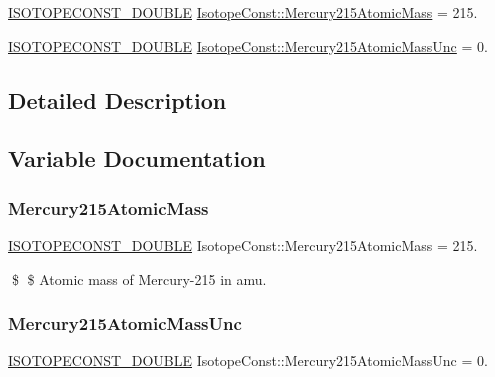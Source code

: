 \begin{DoxyCompactItemize}
\item 
\mbox{\hyperlink{group___isotope_const-_macros_ga8f45a7272ce02c0b4c65c44636ed719a}{I\+S\+O\+T\+O\+P\+E\+C\+O\+N\+S\+T\+\_\+\+D\+O\+U\+B\+LE}} \mbox{\hyperlink{group___isotope_const-_mercury-_hg215_ga5ef3a74131a8ca927cc3a9107f4a1810}{Isotope\+Const\+::\+Mercury215\+Atomic\+Mass}} = 215.
\item 
\mbox{\hyperlink{group___isotope_const-_macros_ga8f45a7272ce02c0b4c65c44636ed719a}{I\+S\+O\+T\+O\+P\+E\+C\+O\+N\+S\+T\+\_\+\+D\+O\+U\+B\+LE}} \mbox{\hyperlink{group___isotope_const-_mercury-_hg215_ga79e4d87707132ab8d67a0b5429750e73}{Isotope\+Const\+::\+Mercury215\+Atomic\+Mass\+Unc}} = 0.
\end{DoxyCompactItemize}


\subsection{Detailed Description}


\subsection{Variable Documentation}
\mbox{\label{group___isotope_const-_mercury-_hg215_ga5ef3a74131a8ca927cc3a9107f4a1810}} 
\subsubsection{\texorpdfstring{Mercury215\+Atomic\+Mass}{Mercury215AtomicMass}}
{\footnotesize\ttfamily \mbox{\hyperlink{group___isotope_const-_macros_ga8f45a7272ce02c0b4c65c44636ed719a}{I\+S\+O\+T\+O\+P\+E\+C\+O\+N\+S\+T\+\_\+\+D\+O\+U\+B\+LE}} Isotope\+Const\+::\+Mercury215\+Atomic\+Mass = 215.}

\$ \$ Atomic mass of Mercury-\/215 in amu. \mbox{\label{group___isotope_const-_mercury-_hg215_ga79e4d87707132ab8d67a0b5429750e73}} 
\subsubsection{\texorpdfstring{Mercury215\+Atomic\+Mass\+Unc}{Mercury215AtomicMassUnc}}
{\footnotesize\ttfamily \mbox{\hyperlink{group___isotope_const-_macros_ga8f45a7272ce02c0b4c65c44636ed719a}{I\+S\+O\+T\+O\+P\+E\+C\+O\+N\+S\+T\+\_\+\+D\+O\+U\+B\+LE}} Isotope\+Const\+::\+Mercury215\+Atomic\+Mass\+Unc = 0.}

